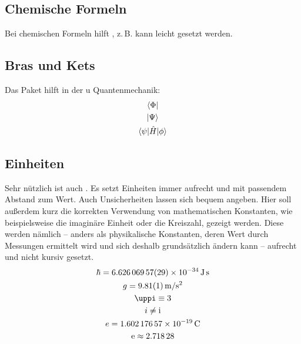 \subsection{Chemische Formeln}
Bei chemischen Formeln hilft , z.\,B. kann leicht  gesetzt werden.
\subsection{Bras und Kets}
Das Paket  hilft in der u
Quantenmechanik:
\begin{gather}
 \bra{\Phi}\\
 \ket{\Psi}\\
 \braket{\psi|\hat{H}|\phi}
\end{gather}
\subsection{Einheiten}
Sehr nützlich ist auch . Es setzt Einheiten immer aufrecht und mit passendem Abstand zum Wert. Auch Unsicherheiten lassen sich bequem angeben. Hier soll außerdem kurz die korrekten Verwendung von mathematischen Konstanten, wie beispielsweise die imaginäre Einheit oder die Kreiszahl, gezeigt werden. Diese werden nämlich -- anders als physikalische Konstanten, deren Wert durch Messungen ermittelt wird und sich deshalb grundsätzlich ändern kann -- aufrecht und nicht kursiv gesetzt.
\begin{gather}
 \hbar = \SI[separate-uncertainty=false]{6.62606957(29)e-34}{\joule\second}\\
 g = \SI{9.81(1)}{\meter \per \s^2}\\
 \pi \equiv 3\\
 i \neq \i\\
 e = \SI{1.60217657e-19}{\coulomb}\\
 \e \approx \num{2.71828}\\
\end{gather}
